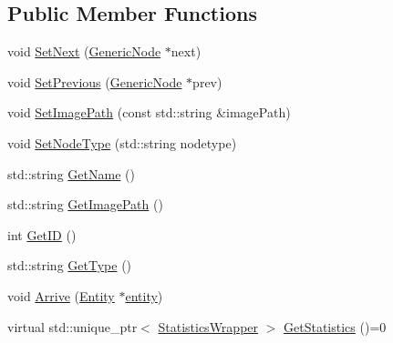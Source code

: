 \subsection*{Public Member Functions}
\begin{DoxyCompactItemize}
\item 
void \hyperlink{class_generic_node_ab627bbdbaaef832b9b79199bac113422}{Set\+Next} (\hyperlink{class_generic_node}{Generic\+Node} $\ast$next)
\item 
void \hyperlink{class_generic_node_a3b03496c103efe7e504f77e22abf851d}{Set\+Previous} (\hyperlink{class_generic_node}{Generic\+Node} $\ast$prev)
\item 
void \hyperlink{class_generic_node_ad309248ab0074f07f329418c0fa996ed}{Set\+Image\+Path} (const std\+::string \&image\+Path)
\item 
void \hyperlink{class_generic_node_ad05137b18cf33caa12d6c0d1293205c2}{Set\+Node\+Type} (std\+::string nodetype)
\item 
std\+::string \hyperlink{class_generic_node_aaf9d163658172370e01ef5da113b66e0}{Get\+Name} ()
\item 
std\+::string \hyperlink{class_generic_node_a42d0bbdf6d82d68c48594b850fc8290f}{Get\+Image\+Path} ()
\item 
int \hyperlink{class_generic_node_aa73c27d677012efdcda65f7908c77758}{Get\+ID} ()
\item 
std\+::string \hyperlink{class_generic_node_a8bee56c218e7d322401a37374acab36a}{Get\+Type} ()
\item 
void \hyperlink{class_generic_node_a923a359d019dc5a97a3da74aa33e2761}{Arrive} (\hyperlink{class_entity}{Entity} $\ast$\hyperlink{_entity_8h_ad79a57ed3105eb60d991a1aeb4a9dc44a428e8fcd53019fa239fa3419261e499e}{entity})
\item 
virtual std\+::unique\+\_\+ptr$<$ \hyperlink{class_generic_node_1_1_statistics_wrapper}{Statistics\+Wrapper} $>$ \hyperlink{class_generic_node_ae7c8424c8c14fd3de993c902d78deb67}{Get\+Statistics} ()=0
\end{DoxyCompactItemize}
